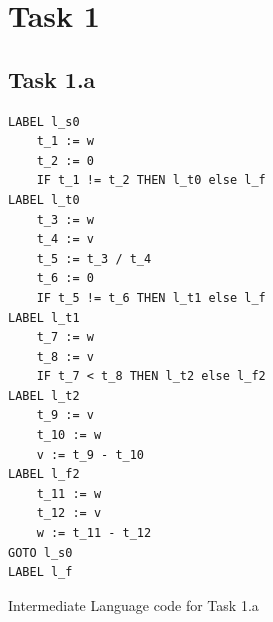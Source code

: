 \documentclass[11pt,a4paper]{article}
\theoremstyle{plain}
\theoremstyle{definition}
\theoremstyle{remark}
\numberwithin{equation}{section}
\begin{document}

\clearpage\maketitle
\thispagestyle{empty}

\clearpage\newpage
\thispagestyle{plain}


\section*{Task 1}
\subsection*{Task 1.a}
\begin{code}[H]
\begin{verbatim}
LABEL l_s0
    t_1 := w
    t_2 := 0
    IF t_1 != t_2 THEN l_t0 else l_f
LABEL l_t0
    t_3 := w
    t_4 := v
    t_5 := t_3 / t_4
    t_6 := 0
    IF t_5 != t_6 THEN l_t1 else l_f
LABEL l_t1
    t_7 := w
    t_8 := v
    IF t_7 < t_8 THEN l_t2 else l_f2
LABEL l_t2
    t_9 := v
    t_10 := w
    v := t_9 - t_10
LABEL l_f2
    t_11 := w
    t_12 := v
    w := t_11 - t_12
GOTO l_s0
LABEL l_f
\end{verbatim}
\caption{Intermediate Language code for Task 1.a}
\label{code:il1a}	
\end{code}
\end{document}
